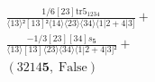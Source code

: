 \documentclass[varwidth, border=5pt]{standalone}
\newcommand{\trfive}{\text{tr5}}
\begin{document}
\begin{my}
$\begin{gathered}
\scriptscriptstyle\frac{1/6[23]\trfive_{1234}}{⟨13⟩²[13]²⟨14⟩⟨23⟩⟨34⟩⟨1|2+4|3]} +\\
\scriptscriptstyle\frac{-1/3[23][34]s_{𝟓}}{⟨13⟩[13]⟨23⟩⟨34⟩⟨1|2+4|3]²} +\\
\scriptscriptstyle(3214𝟓,\;\text{False}) \phantom{+}
\end{gathered}$
\end{my}
\end{document}
